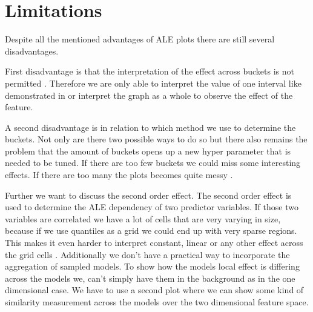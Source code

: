 \documentclass[11pt,
  a4paper,
  parskip=half, %
  BCOR=10mm, %
  english,
  ]{article}
\begin{document}
\section{Limitations} \label{section:pot-ext/limit}

Despite all the mentioned advantages of ALE plots there are still several disadvantages. 

First disadvantage is that the interpretation of the effect across buckets is not permitted \cite{molnar2022}. Therefore we are only able to interpret the value of one interval like demonstrated in  or interpret the graph as a whole to observe the effect of the feature. 

A second disadvantage is in relation to which method we use to determine the buckets. Not only are there two possible ways to do so but there also remains the problem that the amount of buckets opens up a new hyper parameter that is needed to be tuned. If there are too few buckets we could miss some interesting effects. If there are too many the plots becomes quite messy \cite{molnar2022}. 

Further we want to discuss the second order effect. The second order effect is used to determine the ALE dependency of two predictor variables. If those two variables are correlated we have a lot of cells that are very varying in size, because if we use quantiles as a grid we could end up with very sparse regions. This makes it even harder to interpret constant, linear or any other effect across the grid cells \cite{molnar2022}. Additionally we don't have a practical way to incorporate the aggregation of sampled models. To show how the models local effect is differing across the models we, can't simply have them in the background as in the one dimensional case. We have to use a second plot where we can show some kind of similarity measurement across the models over the two dimensional feature space.  



\end{document}

